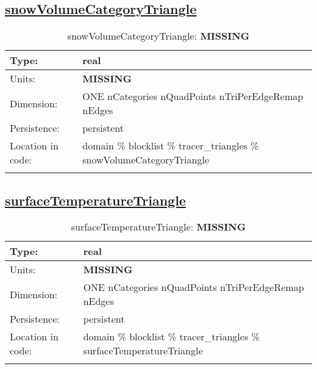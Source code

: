 \subsection[snowVolumeCategoryTriangle]{\hyperref[sec:var_tab_tracer_triangles]{snowVolumeCategoryTriangle}}
\label{subsec:var_sec_tracer_triangles_snowVolumeCategoryTriangle}
\begin{center}
\begin{longtable}{| p{2.0in} | p{4.0in} |}
        \hline 
        Type: & real \\
        \hline 
        Units: & {\bf \color{red} MISSING} \\
        \hline 
        Dimension: & ONE nCategories nQuadPoints nTriPerEdgeRemap nEdges \\
        \hline 
        Persistence: & persistent \\
        \hline 
         Location in code: & domain \% blocklist \% tracer\_triangles \% snowVolumeCategoryTriangle \\
         \hline 
    \caption{snowVolumeCategoryTriangle: {\bf \color{red} MISSING}}
\end{longtable}
\end{center}
\subsection[surfaceTemperatureTriangle]{\hyperref[sec:var_tab_tracer_triangles]{surfaceTemperatureTriangle}}
\label{subsec:var_sec_tracer_triangles_surfaceTemperatureTriangle}
\begin{center}
\begin{longtable}{| p{2.0in} | p{4.0in} |}
        \hline 
        Type: & real \\
        \hline 
        Units: & {\bf \color{red} MISSING} \\
        \hline 
        Dimension: & ONE nCategories nQuadPoints nTriPerEdgeRemap nEdges \\
        \hline 
        Persistence: & persistent \\
        \hline 
         Location in code: & domain \% blocklist \% tracer\_triangles \% surfaceTemperatureTriangle \\
         \hline 
    \caption{surfaceTemperatureTriangle: {\bf \color{red} MISSING}}
\end{longtable}
\end{center}
